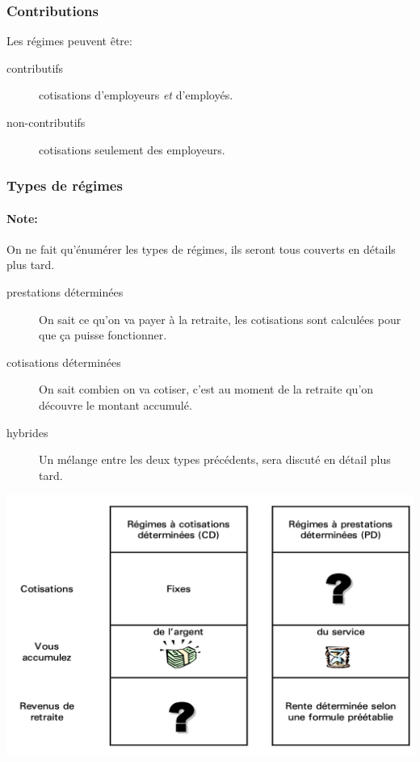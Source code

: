 \documentclass[10pt, french]{article}
\begin{document}
\begin{multicols*}{3}
\subsubsection*{Contributions}
Les régimes peuvent être:
\begin{description}
	\item[contributifs]	cotisations d'employeurs \textit{et} d'employés.
	\item[non-contributifs]	cotisations seulement des employeurs.
\end{description}

\subsubsection*{Types de régimes}

\paragraph{Note:}	On ne fait qu'énumérer les types de régimes, ils seront tous couverts en détails plus tard.

\begin{description}
	\item[prestations déterminées]	On sait ce qu'on va payer à la retraite, les cotisations sont calculées pour que ça puisse fonctionner.
	\item[cotisations déterminées]	On sait combien on va cotiser, c'est au moment de la retraite qu'on découvre le montant accumulé. 
	\item[hybrides] Un mélange entre les deux types précédents, sera discuté en détail plus tard.
\end{description}

\begin{center}
	\includegraphics[scale=0.33]{src/ACT-1005/CD-PD-table.png}
\end{center}


\end{multicols*}
\end{document}

